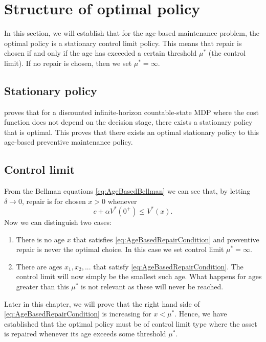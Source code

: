 \section{Structure of optimal policy}
In this section, we will establish that for the age-based maintenance problem, the optimal policy is a stationary control limit policy.
This means that repair is chosen if and only if the age has exceeded a certain threshold $\mu^*$ (the control limit).
If no repair is chosen, then we set $\mu^*=\infty$.

\subsection{Stationary policy}\label{section:AgeBasedStationaryPolicy}
\cite{Puterman2008} proves that for a discounted infinite-horizon countable-state MDP where the cost function does not depend on the decision stage, there exists a stationary policy that is optimal.
This proves that there exists an optimal stationary policy to this age-based preventive maintenance policy.

\subsection{Control limit}\label{section:AgeBasedControlLimit}
From the Bellman equations \eqref{eq:AgeBasedBellman} we can see that, by letting $\delta\rightarrow 0$, repair is for chosen $x>0$ whenever
\begin{equation}\label{eq:AgeBasedRepairCondition}
 c+\alpha V^*(0^+) \leq V^*(x). 
 \end{equation}
Now we can distinguish two cases:
\begin{enumerate}
	\item There is no age $x$ that satisfies \eqref{eq:AgeBasedRepairCondition} and preventive repair is never the optimal choice.
	In this case we set control limit $\mu^*=\infty$.
	\item There are ages $x_1,x_2,...$ that satisfy \eqref{eq:AgeBasedRepairCondition}.
	The control limit will now simply be the smallest such age.
	What happens for ages greater than this $\mu^*$ is not relevant as these will never be reached.
\end{enumerate}
Later in this chapter, we will prove that the right hand side of \eqref{eq:AgeBasedRepairCondition} is increasing for $x<\mu^*$.
Hence, we have established that the optimal policy must be of control limit type where the asset is repaired whenever its age exceeds some threshold $\mu^*$.
